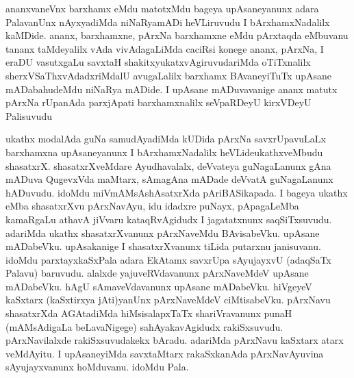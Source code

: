 
\begin{artha}
ananxvaneVnx barxhamx eMdu matotxMdu bageya upAsaneyanunx adara PalavanUnx nAyxyadiMda niNaRyamADi heVLiruvudu I bArxhamxNadalilx kaMDide. ananx, barxhamxne, pArxNa barxhamxne eMdu pArxtaqda eMbuvanu tananx taMdeyalilx vAda vivAdagaLiMda caciRsi konege ananx, pArxNa, I eraDU vasutxgaLu savxtaH shakitxyukatxvAgiruvudariMda oTiTxnalilx sherxVSaThxvAdadxriMdalU avugaLalilx barxhamx BAvaneyiTuTx upAsane mADabahudeMdu niNaRya mADide. I upAsane mADuvavanige ananx matutx pArxNa rUpanAda parxjApati barxhamxnalilx seVpaRDeyU kirxVDeyU Palisuvudu
\end{artha}


\begin{artha}
ukathx modalAda guNa samudAyadiMda kUDida pArxNa savxrUpavuLaLx barxhamxna upAsaneyanunx I bArxhamxNadalilx heVLide\ndash  ukathxveMbudu shasatxrX. shasatxrXveMdare Ayudhavalalx, deVvateya guNagaLanunx gAna mADuva QugevxVda maMtarx, sAmagAna mADade deVvatA guNagaLanunx hADuvudu. idoMdu miVmAMsA\-shAsatxrXda pAriBASikapada. I bageya ukathx eMba shasatxrXvu pArxNavAyu, idu idadxre puNayx, pApagaLeMba kamaRgaLu athavA jiVvaru kataqRvAgidudx I jagatatxnunx saqSiTxsuvudu. adariMda ukathx shasatxrXvanunx pArxNaveMdu BAvisabeVku. upAsane mADabeVku. upAsakanige I shasatxrXvanunx tiLida putarxnu janisuvanu. idoMdu parxtayxkaSxPala adara EkAtamx savxrUpa sAyujayxvU (adaqSaTx Palavu) baruvudu. alalxde yajuveRVdavanunx pArxNaveMdeV upAsane mADabeVku. hAgU sAmaveVdavanunx upAsane mADabeVku. hiVgeyeV kaSxtarx (kaSxtirxya jAti)yanUnx pArxNaveMdeV ciMtisabeVku. pArxNavu shasatxrXda AGAtadiMda hiMsisalapxTaTx shariVravanunx punaH (mAMsAdigaLa beLavaNigege) sahAyakavAgidudx rakiSxsuvudu. pArxNavilalxde rakiSxsuvudakekx bAradu. adariMda pArxNavu kaSxtarx atarx veMdAyitu. I upAsaneyiMda savxtaMtarx rakaSxkanAda pArxNavAyuvina sAyujayxvanunx hoMduvanu. idoMdu Pala.
\end{artha}



